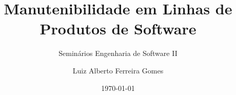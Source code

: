 \author{Luiz Alberto Ferreira Gomes}
\title{Manutenibilidade em Linhas de Produtos de Software}
\subtitle{Seminários Engenharia de Software II}
\date{\today}
